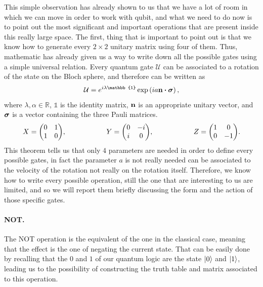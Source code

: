 This simple observation has already shown to us that we have a lot of room in which we can move in order to work with qubit, and what we need to do now is to point out the most significant and important operations that are present inside this really large space. The first, thing that is important to point out is that we know how to generate every $2\times 2$ unitary matrix using four of them. Thus, mathematic has already given us a way to write down all the possible gates using a simple universal relation.
{
    Every quantum gate $\mathcal{U}$ can be associated to a rotation of the state on the Bloch sphere, and therefore can be written as
    \begin{equation}
        \mathcal{U} = e^{i\lambda\mathbb{1}}\exp\left( ia\vb{n}\vdot\vb*{\sigma} \right),
    \end{equation}
    where $\lambda, \alpha\in \mathbb{R}$, $\mathbb{1}$ is the identity matrix, $\vb{n}$ is an appropriate unitary vector, and $\vb*{\sigma}$ is a vector containing the three Pauli matrices.
    \begin{align}
        X = \mqty(\pmat{1}), \hspace{2cm} Y = \mqty(\pmat{2}), \hspace{2cm} Z = \mqty(\pmat{3}). 
    \end{align}
}
\noindent
This theorem tells us that only $4$ parameters are needed in order to define every possible gates, in fact the parameter $a$ is not really needed can be associated to the velocity of the rotation not really on the rotation itself. Therefore, we know how to write every possible operation, still the one that are interesting to us are limited, and so we will report them briefly discussing the form and the action of those specific gates.

\paragraph{NOT.} The NOT operation is the equivalent of the one in the classical case, meaning that the effect is the one of negating the current state. That can be easily done by recalling that the $0$ and $1$ of our quantum logic are the state $\ket{0}$ and $\ket{1}$, leading us to the possibility of constructing the truth table and matrix associated to this operation.

